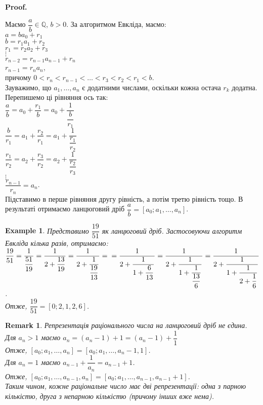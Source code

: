 \documentclass[a4paper, 14pt]{extarticle}
\makeatletter
\theoremstyle{theoremdd}
\theoremstyle{theoremdd}
\theoremstyle{theoremdd}
\theoremstyle{theoremdd}
\newtheorem{example}[theorem]{Example}
\theoremstyle{theoremdd}
\theoremstyle{theoremdd}
\newtheorem{remark}[theorem]{Remark}
\theoremstyle{theoremdd}
\theoremstyle{theoremdd}
\def\qed{$\blacksquare$}
\renewenvironment{proof}[1][Proof.\\]{\par
\pushQED{\hfill \qed}%
\normalfont \topsep6\p@\@plus6\p@\relax
\trivlist
\item\relax
{\bfseries
#1\@addpunct{.}}\hspace\labelsep\ignorespaces
}{%
\popQED\endtrivlist\@endpefalse
}
\makeatother
\begin{document}
\begin{proof}
Маємо $\dfrac{a}{b} \in \mathbb{Q}$, $b >0$. За алгоритмом Евкліда, маємо:\\
$a = ba_0 + r_1$\\
$b = r_1a_1 + r_2$\\
$r_1 = r_2a_2 + r_3$\\
$\vdots$\\
$r_{n-2} = r_{n-1}a_{n-1} + r_n$\\
$r_{n-1} = r_na_n$,\\
причому $0 < r_n < r_{n-1} < \dots < r_3 < r_2 < r_1 < b$.\\
Зауважимо, що $a_1,\dots,a_n$ є додатними числами, оскільки кожна остача $r_k$ додатна. Перепишемо ці рівняння ось так:\\
$\dfrac{a}{b} = a_0 + \dfrac{r_1}{b} = a_0 + \dfrac{1}{\dfrac{b}{r_1}}$\\
$\dfrac{b}{r_1} = a_1 + \dfrac{r_2}{r_1} = a_1 + \dfrac{1}{\dfrac{r_1}{r_2}}$\\
$\dfrac{r_1}{r_2} = a_2 + \dfrac{r_3}{r_2} = a_2 + \dfrac{1}{\dfrac{r_2}{r_3}}$\\
$\vdots$\\
$\dfrac{r_{n-1}}{r_n} = a_n$.\\
Підставимо в перше рівняння другу рівність, а потім третю рівність тощо. В результаті отримаємо ланцюговий дріб $\dfrac{a}{b} = [a_0;a_1,\dots,a_n]$.
\end{proof}

\begin{example}
Представимо $\dfrac{19}{51}$ як ланцюговий дріб. Застосовуючи алгоритм Евкліда кілька разів, отримаємо:\\
$\dfrac{19}{51} = \dfrac{1}{\dfrac{51}{19}} = \dfrac{1}{2 + \dfrac{13}{19}} = \dfrac{1}{2 + \dfrac{1}{\dfrac{19}{13}}} = \\ = \dfrac{1}{2 + \dfrac{1}{1 + \dfrac{6}{13}}} = \dfrac{1}{2 + \dfrac{1}{1 + \dfrac{1}{\dfrac{13}{6}}}} = \dfrac{1}{2 + \dfrac{1}{1 + \dfrac{1}{2 + \dfrac{1}{6}}}}$.\\
Отже, $\dfrac{19}{51} = [0;2,1,2,6]$.
\end{example}

\begin{remark}
Репрезентація раціонального числа на ланцюговий дріб не єдина.\\
Для $a_n > 1$ маємо $a_n = (a_n-1)+1 = (a_n-1) + \dfrac{1}{1}$\\
Отже, $[a_0;a_1,\dots,a_n] = [a_0;a_1,\dots,a_{n}-1,1]$.\\
Для $a_n = 1$ маємо $a_{n-1} + \dfrac{1}{a_n} = a_{n-1}+1$.\\
Отже, $[a_0;a_1,\dots,a_{n-1},a_n] = [a_0;a_1,\dots,a_{n-1},a_{n-1}+1]$.
\bigskip \\
Таким чином, кожне раціональне число має дві репрезентації: одна з парною кількістю, друга з непарною кількістю (причому інших вже нема).
\end{remark}
\end{document}
